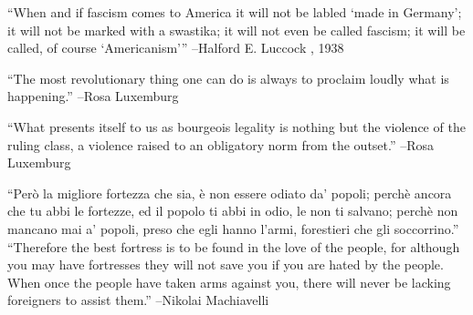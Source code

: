 \documentclass{article}%
\begin{document}
\linebreak%
\vspace{1mm}%
\begin{minipage}{\textwidth}%
\flushleft%
“When and if fascism comes to America it will not be labled ‘made in Germany’; it will not be marked with a swastika; it will not even be called fascism; it will be called, of course ‘Americanism’”%
\linebreak%
\vspace{1mm}%
–Halford E. Luccock%
, 1938%
\linebreak%
\vspace{1mm}%
\end{minipage}%
\linebreak%
\vspace{1mm}%
\begin{minipage}{\textwidth}%
\flushleft%
“The most revolutionary thing one can do is always to proclaim loudly what is happening.”%
\linebreak%
\vspace{1mm}%
–Rosa Luxemburg%
\linebreak%
\vspace{1mm}%
\end{minipage}%
\linebreak%
\vspace{1mm}%
\begin{minipage}{\textwidth}%
\flushleft%
“What presents itself to us as bourgeois legality is nothing but the violence of the ruling class, a violence raised to an obligatory norm from the outset.”%
\linebreak%
\vspace{1mm}%
–Rosa Luxemburg%
\linebreak%
\vspace{1mm}%
\end{minipage}%
\linebreak%
\vspace{1mm}%
\begin{minipage}{\textwidth}%
\flushleft%
“Però la migliore fortezza che sia, è non essere odiato da' popoli; perchè ancora che tu abbi le fortezze, ed il popolo ti abbi in odio, le non ti salvano; perchè non mancano mai a’ popoli, preso che egli hanno l’armi, forestieri che gli soccorrino.”%
\linebreak%
\vspace{1mm}%
“Therefore the best fortress is to be found in the love of the people, for although you may have fortresses they will not save you if you are hated by the people. When once the people have taken arms against you, there will never be lacking foreigners to assist them.”%
\linebreak%
–Nikolai Machiavelli%
\linebreak%
\vspace{1mm}%
\end{minipage}%
\end{document}
